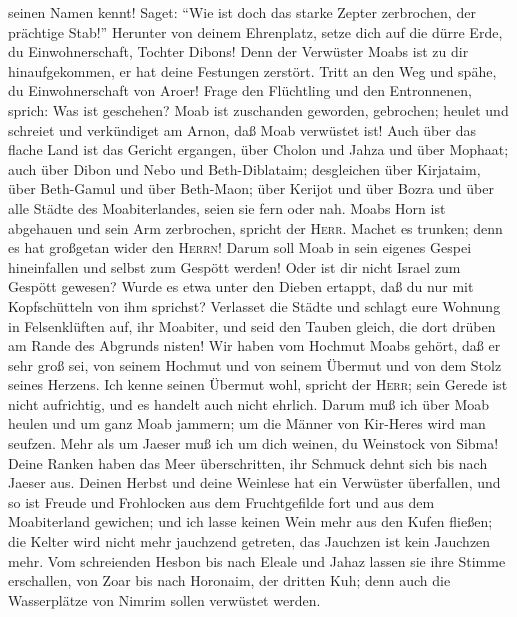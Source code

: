 seinen Namen kennt! Saget: ``Wie ist doch das starke Zepter zerbrochen,
der prächtige Stab!''  Herunter von deinem Ehrenplatz,
setze dich auf die dürre Erde, du Einwohnerschaft, Tochter Dibons! Denn
der Verwüster Moabs ist zu dir hinaufgekommen, er hat deine Festungen
zerstört.  Tritt an den Weg und spähe, du Einwohnerschaft
von Aroer! Frage den Flüchtling und den Entronnenen, sprich: Was ist
geschehen?  Moab ist zuschanden geworden, gebrochen;
heulet und schreiet und verkündiget am Arnon, daß Moab verwüstet ist!
 Auch über das flache Land ist das Gericht ergangen, über
Cholon und Jahza und über Mophaat;  auch über Dibon und
Nebo und Beth-Diblataim;  desgleichen über Kirjataim,
über Beth-Gamul und über Beth-Maon;  über Kerijot und
über Bozra und über alle Städte des Moabiterlandes, seien sie fern oder
nah.  Moabs Horn ist abgehauen und sein Arm zerbrochen,
spricht der \textsc{Herr}.  Machet es trunken; denn es
hat großgetan wider den \textsc{Herrn}! Darum soll Moab in sein eigenes
Gespei hineinfallen und selbst zum Gespött werden!  Oder
ist dir nicht Israel zum Gespött gewesen? Wurde es etwa unter den Dieben
ertappt, daß du nur mit Kopfschütteln von ihm sprichst? 
Verlasset die Städte und schlagt eure Wohnung in Felsenklüften auf, ihr
Moabiter, und seid den Tauben gleich, die dort drüben am Rande des
Abgrunds nisten!  Wir haben vom Hochmut Moabs gehört, daß
er sehr groß sei, von seinem Hochmut und von seinem Übermut und von dem
Stolz seines Herzens.  Ich kenne seinen Übermut wohl,
spricht der \textsc{Herr}; sein Gerede ist nicht aufrichtig, und es
handelt auch nicht ehrlich.  Darum muß ich über Moab
heulen und um ganz Moab jammern; um die Männer von Kir-Heres wird man
seufzen.  Mehr als um Jaeser muß ich um dich weinen, du
Weinstock von Sibma! Deine Ranken haben das Meer überschritten, ihr
Schmuck dehnt sich bis nach Jaeser aus. Deinen Herbst und deine Weinlese
hat ein Verwüster überfallen,  und so ist Freude und
Frohlocken aus dem Fruchtgefilde fort und aus dem Moabiterland gewichen;
und ich lasse keinen Wein mehr aus den Kufen fließen; die Kelter wird
nicht mehr jauchzend getreten, das Jauchzen ist kein Jauchzen mehr.
 Vom schreienden Hesbon bis nach Eleale und Jahaz lassen
sie ihre Stimme erschallen, von Zoar bis nach Horonaim, der dritten Kuh;
denn auch die Wasserplätze von Nimrim sollen verwüstet werden.
